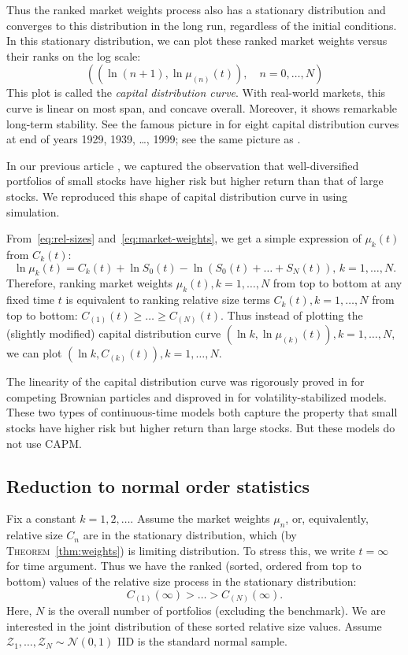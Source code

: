 \documentclass[12pt]{amsart}
\begin{document}
Thus the ranked market weights process also has a stationary distribution and converges to this distribution in the long run, regardless of the initial conditions. In this stationary distribution, we can plot these ranked market weights versus their ranks on the log scale:
$$
\left((\ln(n+1), \ln\mu_{(n)}(t)),\quad n = 0, \ldots, N\right)
$$
This plot is called the {\it capital distribution curve}. With real-world markets, this curve is linear on most span, and concave overall. Moreover, it shows remarkable long-term stability. See the famous picture in \cite[Chapter 4]{FernholzBook} for eight capital distribution curves at end of years 1929, 1939, \ldots, 1999; see the same picture as  \cite[Figure 13.4]{FKSurvey}. 

In our previous article \cite{CAPM-size}, we captured the observation that well-diversified portfolios of small stocks have higher risk but higher return than that of large stocks. We reproduced this shape of capital distribution curve in \cite{CAPM-size} using simulation. 

From~\eqref{eq:rel-sizes} and~\eqref{eq:market-weights}, we get a simple expression of $\mu_k(t)$ from $C_k(t)$:
$$
\ln\mu_k(t) = C_k(t) + \ln S_0(t) - \ln(S_0(t)+\ldots + S_N(t)),\, k  = 1, \ldots, N.
$$
Therefore, ranking market weights $\mu_k(t), k = 1, \ldots, N$ from top to bottom at any fixed time $t$ is equivalent to ranking relative size terms $C_k(t), k = 1, \ldots, N$ from top to bottom:  $C_{(1)}(t) \ge \ldots \ge C_{(N)}(t)$. Thus instead of plotting the (slightly modified) capital distribution curve $(\ln k, \ln\mu_{(k)}(t)), k = 1, \ldots, N$, we can plot $(\ln k, C_{(k)}(t)), k = 1, \ldots, N$. 

The linearity of the capital distribution curve was rigorously proved in  \cite{Chatterjee} for competing Brownian particles and disproved in \cite{Pal} for volatility-stabilized models. These two types of continuous-time models both capture the property that small stocks have higher risk but higher return than large stocks. But these models do not use CAPM.

\subsection{Reduction to normal order statistics} Fix a constant $k = 1, 2, \ldots$. Assume the market weights $\mu_n$, or, equivalently, relative size $C_n$ are in the stationary distribution, which (by \textsc{Theorem}~\ref{thm:weights}) is limiting distribution. To stress this, we write $t = \infty$ for time argument. Thus we have the ranked (sorted, ordered from top to bottom) values of the relative size process in the stationary distribution:
$$
C_{(1)}(\infty) > \ldots > C_{(N)}(\infty).
$$
Here, $N$ is the overall number of portfolios (excluding the benchmark). We are interested in the joint distribution of these sorted relative size values. Assume $\mathcal Z_1, \ldots, \mathcal Z_N \sim \mathcal N(0, 1)$ IID is the standard normal sample. 
\end{document}
